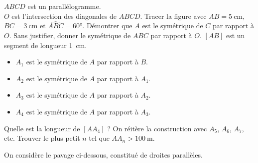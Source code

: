 \documentclass["../Cours.tex"]{subfiles}
\begin{document}
\clearpage
\EXERCICES
\begin{questions}
    \exercice $ABCD$ est un parallélogramme.\\
    $O$ est l'intersection des diagonales de $ABCD$.
        \question Tracer la figure avec $AB=\qty{5}{\centi\metre}$, $BC=\qty{3}{\centi\metre}$ et $\widehat{ABC}=\ang{60}$.
        \question Démontrer que $A$ est le symétrique de $C$ par rapport à $O$.
        \question Sans justifier, donner le symétrique de $ABC$ par rapport à $O$.
    \exercice $[AB]$ est un segment de longueur \qty{1}{\centi\metre}.
    \begin{itemize}
        \item $A_1$ est le symétrique de $A$ par rapport à $B$.
        \item $A_2$ est le symétrique de $A$ par rapport à $A_1$.
        \item $A_3$ est le symétrique de $A$ par rapport à $A_2$.
        \item $A_4$ est le symétrique de $A$ par rapport à $A_3$.
    \end{itemize}
        \question Quelle est la longueur de $[AA_4]$ ?
        \question On réitère la construction avec $A_5$, $A_6$, $A_7$, etc. Trouver le plus petit $n$ tel que $AA_n > \qty{100}{\metre}$.

    \exercice On considère le pavage ci-dessous, constitué de droites parallèles.


\end{questions}
\end{document}

